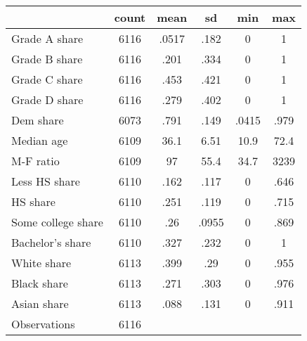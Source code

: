 {
\def\sym#1{\ifmmode^{#1}\else\(^{#1}\)\fi}
\begin{tabular}{l*{1}{ccccc}}
\toprule
                    &       count&        mean&          sd&         min&         max\\
\midrule
Grade A share       &        6116&       .0517&        .182&           0&           1\\
Grade B share       &        6116&        .201&        .334&           0&           1\\
Grade C share       &        6116&        .453&        .421&           0&           1\\
Grade D share       &        6116&        .279&        .402&           0&           1\\
Dem share           &        6073&        .791&        .149&       .0415&        .979\\
Median age          &        6109&        36.1&        6.51&        10.9&        72.4\\
M-F ratio           &        6109&          97&        55.4&        34.7&        3239\\
Less HS share       &        6110&        .162&        .117&           0&        .646\\
HS share            &        6110&        .251&        .119&           0&        .715\\
Some college share  &        6110&         .26&       .0955&           0&        .869\\
Bachelor's share    &        6110&        .327&        .232&           0&           1\\
White share         &        6113&        .399&         .29&           0&        .955\\
Black share         &        6113&        .271&        .303&           0&        .976\\
Asian share         &        6113&        .088&        .131&           0&        .911\\
\midrule
Observations        &        6116&            &            &            &            \\
\bottomrule
\end{tabular}
}
